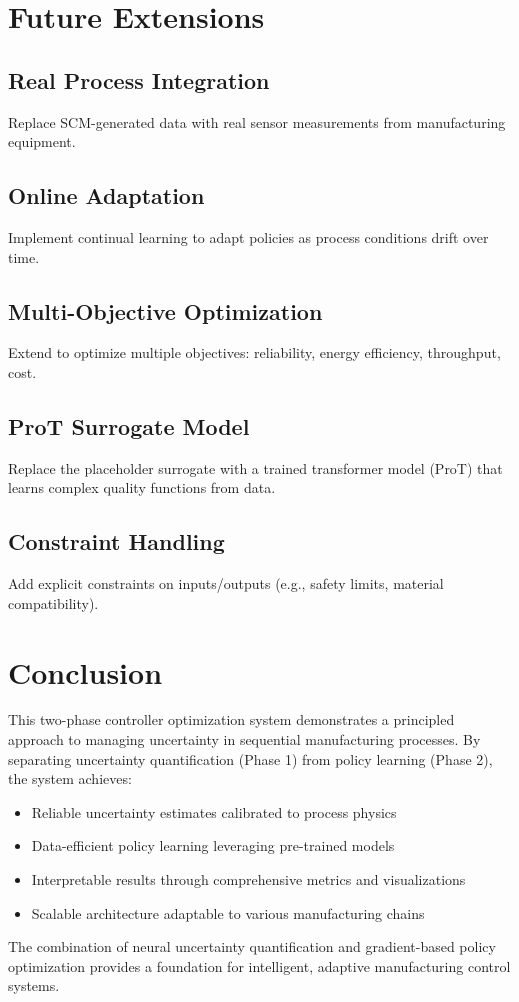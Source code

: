 \documentclass[11pt,a4paper]{article}
\begin{document}
\section{Future Extensions}

\subsection{Real Process Integration}
Replace SCM-generated data with real sensor measurements from manufacturing equipment.

\subsection{Online Adaptation}
Implement continual learning to adapt policies as process conditions drift over time.

\subsection{Multi-Objective Optimization}
Extend to optimize multiple objectives: reliability, energy efficiency, throughput, cost.

\subsection{ProT Surrogate Model}
Replace the placeholder surrogate with a trained transformer model (ProT) that learns complex quality functions from data.

\subsection{Constraint Handling}
Add explicit constraints on inputs/outputs (e.g., safety limits, material compatibility).

\section{Conclusion}

This two-phase controller optimization system demonstrates a principled approach to managing uncertainty in sequential manufacturing processes. By separating uncertainty quantification (Phase 1) from policy learning (Phase 2), the system achieves:

\begin{itemize}
    \item Reliable uncertainty estimates calibrated to process physics
    \item Data-efficient policy learning leveraging pre-trained models
    \item Interpretable results through comprehensive metrics and visualizations
    \item Scalable architecture adaptable to various manufacturing chains
\end{itemize}

The combination of neural uncertainty quantification and gradient-based policy optimization provides a foundation for intelligent, adaptive manufacturing control systems.
\end{document}
